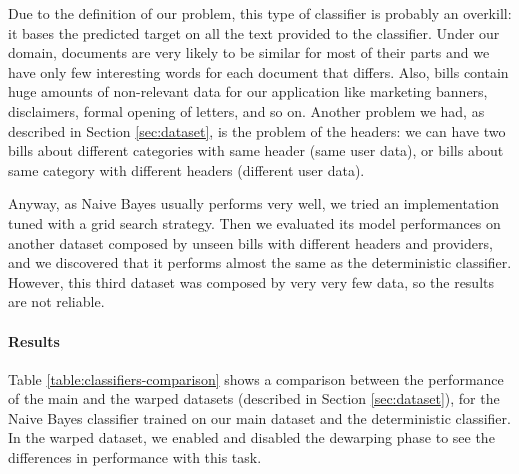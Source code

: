 \documentclass[10pt,twocolumn,letterpaper]{article}
\begin{document}
Due to the definition of our problem, this type of classifier is
probably an overkill: it bases the predicted target on all the text
provided to the classifier. Under our domain, documents are very
likely to be similar for most of their parts and we have only few
interesting words for each document that differs. Also, bills contain
huge amounts of non-relevant data for our application like marketing
banners, disclaimers, formal opening of letters, and so on. Another
problem we had, as described in Section \ref{sec:dataset}, is the
problem of the headers: we can have two bills about different
categories with same header (same user data), or bills about same
category with different headers (different user data).

Anyway, as Naive Bayes usually performs very well, we tried an
implementation tuned with a grid search strategy. Then we evaluated
its model performances on another dataset composed by unseen bills
with different headers and providers, and we discovered that it
performs almost the same as the deterministic classifier.  However,
this third dataset was composed by very very few data, so the results
are not reliable.

\paragraph{Results}

Table \ref{table:classifiers-comparison} shows a comparison between
the performance of the main and the warped datasets (described in
Section \ref{sec:dataset}), for the Naive Bayes classifier trained on
our main dataset and the deterministic classifier. In the warped
dataset, we enabled and disabled the dewarping phase to see the
differences in performance with this task.
\end{document}
